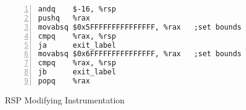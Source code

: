 \begin{figure}[hbp]
\begin{center}
\begin{minipage}{0.4\textwidth}
\begin{lstlisting}[basicstyle=\scriptsize,numbers=left]
andq    $-16, %rsp
pushq   %rax
movabsq $0x5FFFFFFFFFFFFFFF, %rax   ;set bounds
cmpq    %rax, %rsp
ja      exit_label
movabsq $0x6FFFFFFFFFFFFFFF, %rax   ;set bounds
cmpq    %rax, %rsp
jb      exit_label
popq    %rax
\end{lstlisting}
\end{minipage}
\end{center}
\caption{RSP Modifying Instrumentation}\label{fg-rsp}
\end{figure}